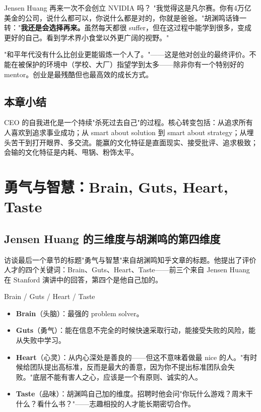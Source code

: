 \documentclass[a4paper]{article}
\begin{document}
\begin{knowledgebox}{Jensen Huang 再来一次不会创立 NVIDIA 吗？}
"我觉得这是凡尔赛。你有4万亿美金的公司，说什么都可以，你说什么都是对的，你就是爸爸。"胡渊鸣话锋一转："\textbf{我还是会选择再来。}虽然每天都很 suffer，但在这过程中能学到很多，变成更好的自己。看到学术界小食堂以外更广阔的视野。"
\end{knowledgebox}

"和平年代没有什么比创业更能锻炼一个人了。"——这是他对创业的最终评价。不能在被保护的环境中（学校、大厂）指望学到太多——除非你有一个特别好的 mentor。创业是最残酷但也最高效的成长方式。

\subsection{本章小结}

CEO 的自我进化是一个持续"杀死过去自己"的过程。核心转变包括：从追求所有人喜欢到追求事业成功；从 smart about solution 到 smart about strategy；从埋头苦干到打开眼界、多交流。能赢的文化特征是直面现实、接受批评、追求极致；会输的文化特征是内耗、甩锅、粉饰太平。

\section{勇气与智慧：Brain, Guts, Heart, Taste}

\subsection{Jensen Huang 的三维度与胡渊鸣的第四维度}

访谈最后一个章节的标题"勇气与智慧"来自胡渊鸣知乎文章的标题。他提出了评价人才的四个关键词：Brain、Guts、Heart、Taste——前三个来自 Jensen Huang 在 Stanford 演讲中的回答，第四个是他自己加的。

\begin{importantbox}{{Brain / Guts / Heart / Taste}}
\begin{itemize}
\item \textbf{Brain}（头脑）：最强的 problem solver。
\item \textbf{Guts}（勇气）：能在信息不完全的时候快速采取行动，能接受失败的风险，能从失败中学习。
\item \textbf{Heart}（心灵）：从内心深处是善良的——但这不意味着做最 nice 的人。"有时候给团队提出高标准，反而是最大的善意，因为你不提出标准团队会失败。"底层不能有害人之心，应该是一个有原则、诚实的人。
\item \textbf{Taste}（品味）：胡渊鸣自己加的维度。招聘时他会问"你玩什么游戏？周末干什么？看什么书？"——志趣相投的人才能长期密切合作。
\end{itemize}
\end{importantbox}
\end{document}
